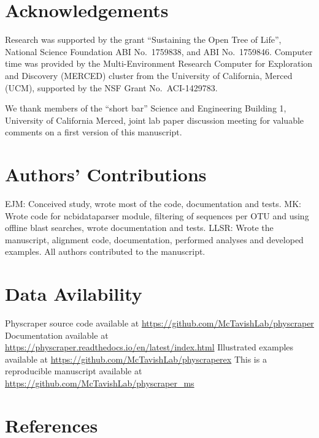\documentclass[]{article}
\begin{document}
\hypertarget{acknowledgements}{%
\section{Acknowledgements}\label{acknowledgements}}

Research was supported by the grant ``Sustaining the Open Tree of Life'', National Science Foundation ABI No.~1759838, and ABI No.~1759846.
Computer time was provided by the Multi-Environment Research Computer for Exploration and Discovery (MERCED) cluster from the University of California, Merced (UCM), supported by the NSF Grant No.~ACI-1429783.

We thank members of the ``short bar'' Science and Engineering Building 1, University of California Merced, joint lab paper discussion meeting for valuable comments on a first version of this manuscript.

\hypertarget{authors-contributions}{%
\section{Authors' Contributions}\label{authors-contributions}}

EJM: Conceived study, wrote most of the code, documentation and tests.
MK: Wrote code for ncbidataparser module, filtering of sequences per OTU and using offline blast searches, wrote documentation and tests.
LLSR: Wrote the manuscript, alignment code, documentation, performed analyses and developed examples.
All authors contributed to the manuscript.

\hypertarget{data-avilability}{%
\section{Data Avilability}\label{data-avilability}}

Physcraper source code available at \url{https://github.com/McTavishLab/physcraper}
Documentation available at \url{https://physcraper.readthedocs.io/en/latest/index.html}
Illustrated examples available at \url{https://github.com/McTavishLab/physcraperex}
This is a reproducible manuscript available at \url{https://github.com/McTavishLab/physcraper_ms}

\newpage

\hypertarget{references}{%
\section{References}\label{references}}
\end{document}
